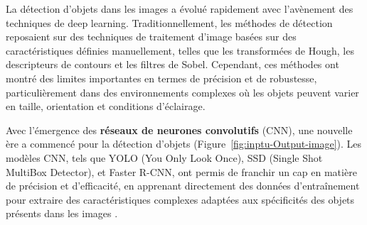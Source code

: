 La détection d'objets dans les images a évolué rapidement avec l'avènement des techniques de deep learning. Traditionnellement, les méthodes de détection reposaient sur des techniques de traitement d'image basées sur des caractéristiques définies manuellement, telles que les transformées de Hough, les descripteurs de contours et les filtres de Sobel. Cependant, ces méthodes ont montré des limites importantes en termes de précision et de robustesse, particulièrement dans des environnements complexes où les objets peuvent varier en taille, orientation et conditions d'éclairage.

Avec l'émergence des \textbf{réseaux de neurones convolutifs} (CNN), une nouvelle ère a commencé pour la détection d'objets (Figure~\ref{fig:inptu-Output-image}). Les modèles CNN, tels que YOLO (You Only Look Once), SSD (Single Shot MultiBox Detector), et Faster R-CNN, ont permis de franchir un cap en matière de précision et d'efficacité, en apprenant directement des données d'entraînement pour extraire des caractéristiques complexes adaptées aux spécificités des objets présents dans les images \cite{kamran2020, gupta2021}.

